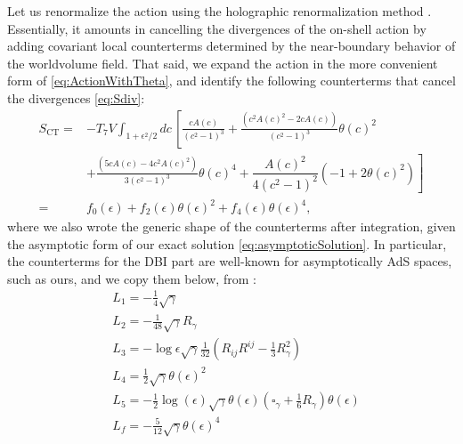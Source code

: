 Let us renormalize the action using the holographic renormalization method \cite{Bianchi:2001kw}. Essentially, it amounts in cancelling the divergences of the on-shell action by adding covariant local counterterms determined by the near-boundary behavior of the worldvolume field.
That said, we expand the action in the more convenient form of \eqref{eq:ActionWithTheta}, and identify the following counterterms that cancel the divergences \eqref{eq:Sdiv}:
\begin{align}\label{eq:counterterms}
 S_\text{CT} = & -T_7 V \int_{1 + \epsilon^2/2} d c \, 
                \left[ 
                \frac{c A(c)}{\left(c^2-1\right)^3} 
                +\frac{\left(c^2 A(c)^2-2 c A(c)\right)}{\left(c^2-1\right)^3} \theta (c)^2              
                \right. \nonumber \\
     & \left. 
     +\frac{\left(5 c A(c)-4 c^2 A(c)^2\right) }{3 \left(c^2-1\right)^3}\theta (c)^4
     + \dfrac{A(c)^2}{4 \left(c^2-1\right)^2}\left(- 1 + 2 \theta(c)^2\right) \right]\nonumber \\
     = & f_0(\epsilon) +  f_2(\epsilon) \theta (\epsilon)^2 +  f_4(\epsilon) \theta (\epsilon)^4,
\end{align}
where we also wrote the generic shape of the counterterms after integration, given the asymptotic form of our exact solution \eqref{eq:asymptoticSolution}. In particular, the counterterms for the DBI part are well-known for asymptotically AdS spaces, such as ours, and we copy them below, from \cite{Karch:2005ms}:
\begin{align*}
& L_{1}=-\frac{1}{4} \sqrt{\gamma} \\
& L_{2}=-\frac{1}{48} \sqrt{\gamma} R_{\gamma}\\
& L_{3}=-\log \epsilon \sqrt{\gamma} \frac{1}{32}\left(R_{i j} R^{i j}-\frac{1}{3} R_{\gamma}^{2}\right) \\
& L_{4}=\frac{1}{2} \sqrt{\gamma} \theta(\epsilon)^2 \\
& L_{5}=-\frac{1}{2} \log (\epsilon) \sqrt{\gamma} \theta(\epsilon)\left(\square_{\gamma}+\frac{1}{6} R_{\gamma}\right) \theta( \epsilon)\\
& L_{f}= -\frac{5}{12}\sqrt{\gamma} \theta(\epsilon)^4
\end{align*}
